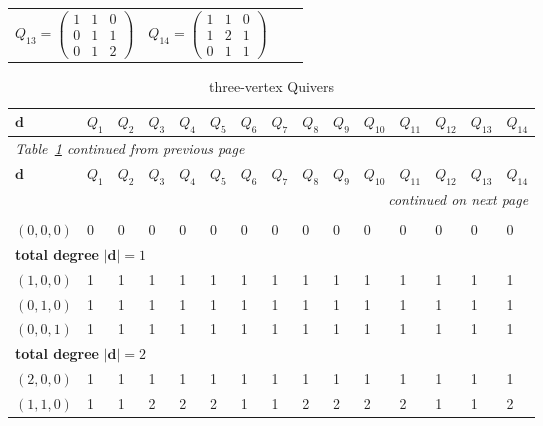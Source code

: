 \documentclass{article}
\newcommand{\bd}{\mathbf{d}}
\begin{document}
\begin{tabular}{llll}
$Q_{13}=\left(\begin{smallmatrix}1&1&0\\0&1&1\\0&1&2\end{smallmatrix}\right)$ & $Q_{14}=\left(\begin{smallmatrix}1&1&0\\1&2&1\\0&1&1\end{smallmatrix}\right)$ &  &  \\[4pt]
\end{tabular}
\renewcommand{\arraystretch}{1.0}

\small
\setlength{\tabcolsep}{3pt}
\begin{longtable}{|l|l|l|l|l|l|l|l|l|l|l|l|l|l|l|}
\caption{three-vertex Quivers}\label{tab:3vtx}\\
\hline
$\bd$ & $Q_{1}$ & $Q_{2}$ & $Q_{3}$ & $Q_{4}$ & $Q_{5}$ & $Q_{6}$ & $Q_{7}$ & $Q_{8}$ & $Q_{9}$ & $Q_{10}$ & $Q_{11}$ & $Q_{12}$ & $Q_{13}$ & $Q_{14}$ \\ \hline\hline
\endfirsthead
\multicolumn{15}{l}{\small\itshape Table~\ref{tab:3vtx} continued from previous page} \\ \hline
$\bd$ & $Q_{1}$ & $Q_{2}$ & $Q_{3}$ & $Q_{4}$ & $Q_{5}$ & $Q_{6}$ & $Q_{7}$ & $Q_{8}$ & $Q_{9}$ & $Q_{10}$ & $Q_{11}$ & $Q_{12}$ & $Q_{13}$ & $Q_{14}$ \\ \hline\hline
\endhead
\hline \multicolumn{15}{r}{\small\itshape continued on next page} \\
\endfoot
\hline
\endlastfoot
\multicolumn{15}{|l|}{\textbf{total degree }$|\bd|=0$} \\ \hline
$(0,0,0)$ & 0 & 0 & 0 & 0 & 0 & 0 & 0 & 0 & 0 & 0 & 0 & 0 & 0 & 0 \\ \hline
\multicolumn{15}{|l|}{\textbf{total degree }$|\bd|=1$} \\ \hline
$(1,0,0)$ & 1 & 1 & 1 & 1 & 1 & 1 & 1 & 1 & 1 & 1 & 1 & 1 & 1 & 1 \\ \hline
$(0,1,0)$ & 1 & 1 & 1 & 1 & 1 & 1 & 1 & 1 & 1 & 1 & 1 & 1 & 1 & 1 \\ \hline
$(0,0,1)$ & 1 & 1 & 1 & 1 & 1 & 1 & 1 & 1 & 1 & 1 & 1 & 1 & 1 & 1 \\ \hline
\multicolumn{15}{|l|}{\textbf{total degree }$|\bd|=2$} \\ \hline
$(2,0,0)$ & 1 & 1 & 1 & 1 & 1 & 1 & 1 & 1 & 1 & 1 & 1 & 1 & 1 & 1 \\ \hline
$(1,1,0)$ & 1 & 1 & 2 & 2 & 2 & 1 & 1 & 2 & 2 & 2 & 2 & 1 & 1 & 2 \\ \hline

\end{longtable}
\end{document}
